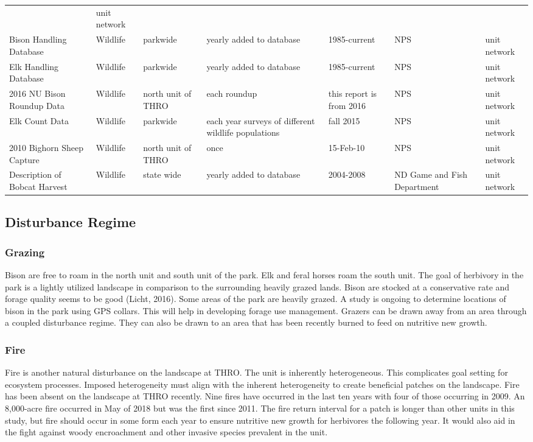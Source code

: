 \begin{longtable}[l]{@{}p{5cm}p{2cm}p{3cm}p{4cm}p{3cm}p{4cm}p{3cm}@{}}
& unit network\tabularnewline
Bison Handling Database & Wildlife & parkwide & yearly added to database
& 1985-current & NPS & unit network\tabularnewline
Elk Handling Database & Wildlife & parkwide & yearly added to database &
1985-current & NPS & unit network\tabularnewline
2016 NU Bison Roundup Data & Wildlife & north unit of THRO & each
roundup & this report is from 2016 & NPS & unit network\tabularnewline
Elk Count Data & Wildlife & parkwide & each year surveys of different
wildlife populations & fall 2015 & NPS & unit network\tabularnewline
2010 Bighorn Sheep Capture & Wildlife & north unit of THRO & once &
15-Feb-10 & NPS & unit network\tabularnewline
Description of Bobcat Harvest & Wildlife & state wide & yearly added to
database & 2004-2008 & ND Game and Fish Department & unit
network\tabularnewline
\bottomrule
\end{longtable}
\clearpage
\normalsetting
\pagestyle{fancy} 

\subsection{Disturbance Regime }

\subsubsection{Grazing }

Bison are free to roam in the north unit and south unit of the park. 
Elk and feral horses roam the south unit. 
The goal of herbivory in the park is a lightly utilized landscape in comparison to the surrounding heavily grazed lands. 
Bison are stocked at a conservative rate and forage quality seems to be good (Licht, 2016). 
Some areas of the park are heavily grazed. 
A study is ongoing to determine locations of bison in the park using GPS collars. 
This will help in developing forage use management. 
Grazers can be drawn away from an area through a coupled disturbance regime. 
They can also be drawn to an area that has been recently burned to feed on nutritive new growth.

\subsubsection{Fire }

Fire is another natural disturbance on the landscape at THRO. 
The unit is inherently heterogeneous. 
This complicates goal setting for ecosystem processes. 
Imposed heterogeneity must align with the inherent heterogeneity to create beneficial patches on the landscape. 
Fire has been absent on the landscape at THRO recently. 
Nine fires have occurred in the last ten years with four of those occurring in 2009. 
An 8,000-acre fire occurred in May of 2018 but was the first since 2011. 
The fire return interval for a patch is longer than other units in this study, but fire should occur in some form each year to ensure nutritive new growth for herbivores the following year. 
It would also aid in the fight against woody encroachment and other invasive species prevalent in the unit.

